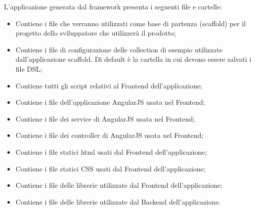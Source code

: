 L'applicazione generata dal framework presenta i seguenti file e cartelle: 
\begin{itemize}
 \item \textbf{}
 
	Contiene i file che verranno utilizzati come base di partenza (scaffold) per il progetto dello sviluppatore che utilizzerà il prodotto;

 \item \textbf{}
 
	Contiene i file di configurazione delle collection di esempio utilizzate dall'applicazione scaffold. Di default è la cartella in cui devono essere salvati i file DSL;

 \item \textbf{} 
 
	Contiene tutti gli script relativi al Frontend dell'applicazione;

 \item \textbf{}
 
	Contiene i file dell'applicazione AngularJS usata nel Frontend;

 \item \textbf{}
 
	Contiene i file dei service di AngularJS usata nel Frontend;

 \item \textbf{}
 
	Contiene i file dei controller di AngularJS usata nel Frontend;

 \item \textbf{}
 
	Contiene i file statici html usati dal Frontend dell'applicazione;

 \item \textbf{}
 
	Contiene i file statici CSS usati dal Frontend dell'applicazione;

 \item \textbf{}
 
	Contiene i file delle librerie utilizzate dal Frontend dell'applicazione;
	
 \item \textbf{}
 
	Contiene i file delle librerie utilizzate dal Backend dell'applicazione.
\end{itemize}
